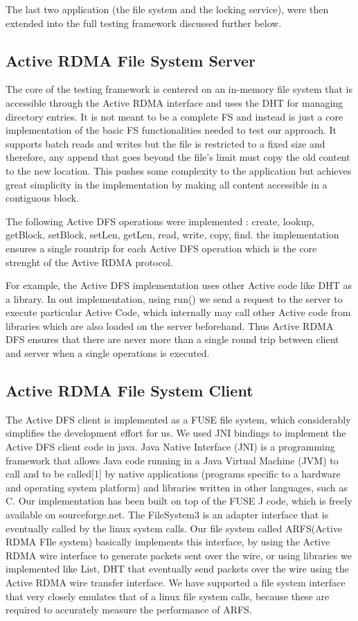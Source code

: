 \documentclass[10pt]{article}
\begin{document}
The last two application (the file system and the locking service), were then extended into the full testing framework discussed further below.

\subsection{Active RDMA File System Server}

The core of the testing framework is centered on an in-memory file system that is accessible through the Active RDMA interface and uses the DHT for managing directory entries. It is not meant to be a complete FS and instead is just a core implementation of the basic FS functionalities needed to test our approach. It supports batch reads and writes but the file is restricted to a fixed size and therefore, any append that goes beyond the file's limit must copy the old content to the new location. This pushes some complexity to the application but achieves great simplicity in the implementation by making all content accessible in a contiguous block.

The following Active DFS operations were implemented : create, lookup, getBlock, setBlock, setLen, getLen, read, write, copy, find. the implementation ensures a single rountrip for each Active DFS operation which is the core strenght of the Avtive RDMA protocol.

For example, the Active DFS implementation uses other Active code like DHT as a library. In out implementation, using run() we send a request to the server to execute particular Active Code, which internally may call other Active code from libraries which are also loaded on the server beforehand. Thus Active RDMA DFS ensures that there are never more than a single round trip between client and server when a single operations is executed. 


\subsection{Active RDMA File System Client}

The Active DFS client is implemented as a FUSE file system, which considerably simplifies the development effort for us. We used JNI bindings to implement the Active DFS client code in java. Java Native Interface (JNI) is a programming framework that allows Java code running in a Java Virtual Machine (JVM) to call and to be called[1]  by native applications (programs specific to a hardware  and operating system platform) and libraries written in other languages, such as C. Our implementation has been built on top of the FUSE J code, which is freely available on sourceforge.net. The FileSystem3 is an adapter interface that is eventually called by the linux system calls. Our file system called ARFS(Active RDMA FIle system) basically implements this interface, by using the Active RDMA wire interface to generate packets sent over the wire, or using libraries we implemented like List, DHT that eventually send packets over the wire using the Active RDMA wire transfer interface. We have supported a file system interface that very closely emulates that of a linux file system calls, because these are required to accurately measure the performance of ARFS.
\end{document}
